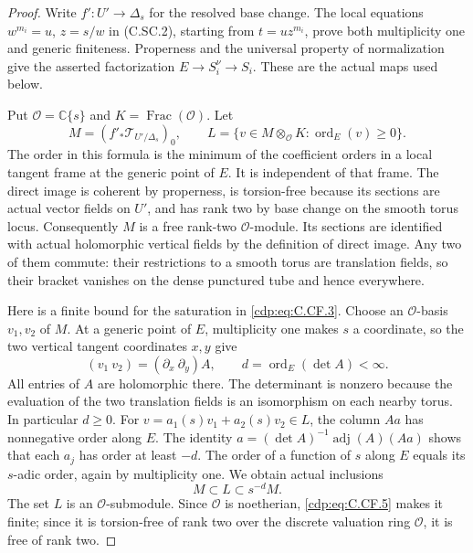\begin{proof}
Write $f':U'\to\Delta_s$ for the resolved base change.
The local equations
$w^{m_i}=u$, $z=s/w$ in (C.SC.2), starting from
$t=u z^{m_i}$, prove both multiplicity one and generic
finiteness. Properness and the universal property of normalization
give the asserted factorization $E\to S_i^\nu\to S_i$.
These are the actual maps used below.

Put $\mathcal O=\mathbb C\{s\}$ and
$K=\operatorname{Frac}(\mathcal O)$. Let
\[
 M=(f'_*\mathcal T_{U'/\Delta_s})_0,
 \qquad
 L=\{v\in M\otimes_{\mathcal O}K:
                     \operatorname{ord}_E(v)\ge0\}.
 \tag{C.CF.3}\label{cdp:eq:C.CF.3}
\]
The order in this formula is the minimum of the coefficient
orders in a local tangent frame at the generic point of $E$.
It is independent of that frame. The direct image is coherent
by properness, is torsion-free because its sections are actual
vector fields on $U'$, and has rank two by base change on the
smooth torus locus. Consequently $M$ is a free rank-two
$\mathcal O$-module. Its sections are identified with actual
holomorphic vertical fields by the definition of direct image.
Any two of them commute: their restrictions to a smooth torus
are translation fields, so their bracket vanishes on the dense
punctured tube and hence everywhere.

Here is a finite bound for the saturation in \eqref{cdp:eq:C.CF.3}.
Choose an $\mathcal O$-basis $v_1,v_2$ of $M$.
At a generic point of $E$, multiplicity one makes $s$ a
coordinate, so the two vertical tangent coordinates $x,y$
give
\[
 (v_1\ v_2)=(\partial_x\ \partial_y)A,
 \qquad d=\operatorname{ord}_E(\det A)<\infty.
 \tag{C.CF.4}\label{cdp:eq:C.CF.4}
\]
All entries of $A$ are holomorphic there. The determinant is
nonzero because the evaluation of the two translation fields
is an isomorphism on each nearby torus. In particular $d\ge0$.
For $v=a_1(s)v_1+a_2(s)v_2\in L$, the column $Aa$ has
nonnegative order along $E$. The identity
$a=(\det A)^{-1}\operatorname{adj}(A)(Aa)$ shows that
each $a_j$ has order at least $-d$. The order of a function
of $s$ along $E$ equals its $s$-adic order, again by
multiplicity one. We obtain actual inclusions
\[
                        M\subset L\subset s^{-d}M.
 \tag{C.CF.5}\label{cdp:eq:C.CF.5}
\]
The set $L$ is an $\mathcal O$-submodule. Since $\mathcal O$
is noetherian, \eqref{cdp:eq:C.CF.5} makes it finite; since it is torsion-free
of rank two over the discrete valuation ring $\mathcal O$,
it is free of rank two.


\end{proof}
